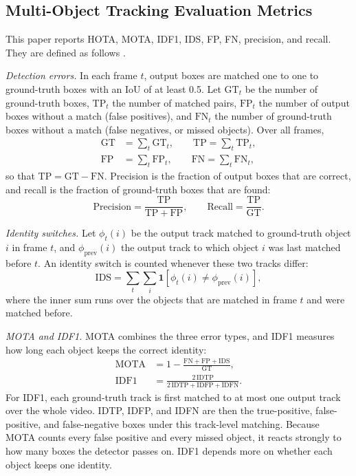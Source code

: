 \documentclass[pdflatex,sn-mathphys-num,iicol]{sn-jnl}
\begin{document}
\subsection{Multi-Object Tracking Evaluation Metrics}\label{sec:metrics}
This paper reports HOTA, MOTA, IDF1, IDS, FP, FN, precision, and recall. They
are defined as follows \cite{dendorfer2021motchallenge,luiten2021hota}.

\emph{Detection errors.} In each frame $t$, output boxes are matched one to
one to ground-truth boxes with an IoU of at least 0.5. Let $\mathrm{GT}_t$ be
the number of ground-truth boxes, $\mathrm{TP}_t$ the number of matched pairs,
$\mathrm{FP}_t$ the number of output boxes without a match (false positives),
and $\mathrm{FN}_t$ the number of ground-truth boxes without a match (false
negatives, or missed objects). Over all frames,
\begin{align}
\mathrm{GT}&=\sum_t \mathrm{GT}_t,\qquad \mathrm{TP}=\sum_t \mathrm{TP}_t,\label{eq:gt}\\
\mathrm{FP}&=\sum_t \mathrm{FP}_t,\qquad \mathrm{FN}=\sum_t \mathrm{FN}_t,\label{eq:fpfn}
\end{align}
so that $\mathrm{TP}=\mathrm{GT}-\mathrm{FN}$. Precision is the fraction of
output boxes that are correct, and recall is the fraction of ground-truth
boxes that are found:
\begin{equation}
\mathrm{Precision}=\frac{\mathrm{TP}}{\mathrm{TP}+\mathrm{FP}},\qquad
\mathrm{Recall}=\frac{\mathrm{TP}}{\mathrm{GT}}.
\label{eq:prrc}
\end{equation}

\emph{Identity switches.} Let $\phi_t(i)$ be the output track matched to
ground-truth object $i$ in frame $t$, and $\phi_{\mathrm{prev}}(i)$ the
output track to which object $i$ was last matched before $t$. An identity
switch is counted whenever these two tracks differ:
\begin{equation}
\mathrm{IDS}=\sum_t\sum_{i}\mathbf{1}\!\left[\phi_t(i)\neq\phi_{\mathrm{prev}}(i)\right],
\label{eq:ids}
\end{equation}
where the inner sum runs over the objects that are matched in frame $t$ and
were matched before.

\emph{MOTA and IDF1.} MOTA combines the three error types, and IDF1 measures
how long each object keeps the correct identity:
\begin{align}
\mathrm{MOTA}&=1-\frac{\mathrm{FN}+\mathrm{FP}+\mathrm{IDS}}{\mathrm{GT}},\label{eq:mota}\\
\mathrm{IDF1}&=\frac{2\,\mathrm{IDTP}}{2\,\mathrm{IDTP}+\mathrm{IDFP}+\mathrm{IDFN}}.\label{eq:idf1}
\end{align}
For IDF1, each ground-truth track is first matched to at most one output
track over the whole video. IDTP, IDFP, and IDFN are then the true-positive,
false-positive, and false-negative boxes under this track-level matching.
Because MOTA counts every false positive and every missed object, it reacts
strongly to how many boxes the detector passes on. IDF1 depends more on
whether each object keeps one identity.
\end{document}
